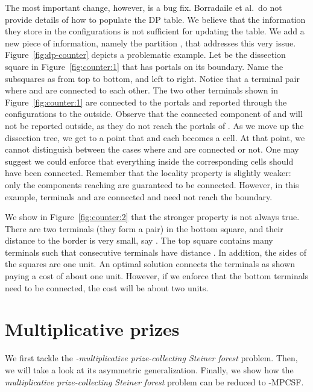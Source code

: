 \documentclass[extras,11pt]{article} \usepackage{fullpage}
\theoremstyle{mytheorem}
\newcommand{\prob}[1]{\textit{#1}}
\begin{document}
The most important change, however, is a bug fix.
Borradaile et al.\ do not provide details of how to populate the DP  table.
We believe that the information they store in the configurations is not sufficient for updating the table.
We add a new piece of information, namely the partition , that addresses this very issue.
Figure~\ref{fig:dp-counter} depicts a problematic example.
Let  be the dissection square in Figure~\ref{fig:counter:1} that has portals on its boundary.
Name the subsquares as  from top to bottom, and left to right.
Notice that a terminal pair  where  and  are connected to each other.
The two other terminals shown in Figure~\ref{fig:counter:1} are connected to the portals and reported through the configurations to the outside.
Observe that the connected component of  and  will not be reported outside, as they do not reach the portals of .
As we move up the dissection tree, we get to a point that  and  each becomes a cell.
At that point, we cannot distinguish between the cases where  and  are connected or not.
One may suggest we could enforce that everything inside the corresponding cells should have been connected.
Remember that the locality property is slightly weaker: only the components reaching  are guaranteed to be connected.
However, in this example, terminals  and  are connected and need not reach the boundary.

We show in Figure~\ref{fig:counter:2} that the stronger property is not always true.
There are two terminals (they form a pair) in the bottom square,
and their distance to the border is very small, say .
The top square contains many terminals such that consecutive terminals have distance .
In addition, the sides of the squares are one unit.
An optimal solution connects the terminals as shown paying a cost of about one unit.
However, if we enforce that the bottom terminals need to be connected, the cost will be about two units.
\fi







\section{Multiplicative prizes}\label{sec:multi}

We first tackle the \prob{-multiplicative prize-collecting Steiner forest} problem.
Then, we will take a look at its asymmetric generalization.
Finally, we show how the \prob{multiplicative prize-collecting Steiner forest} problem can be reduced to -MPCSF.
\end{document}
